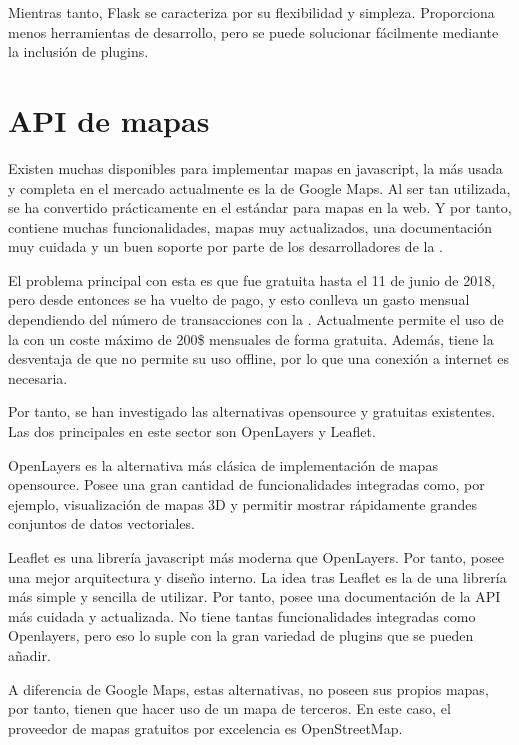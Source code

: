     Mientras tanto, Flask se caracteriza por su flexibilidad y simpleza. Proporciona menos herramientas de desarrollo, pero se puede solucionar fácilmente mediante la inclusión de plugins.
    
  
  \section{API de mapas}
  
    Existen muchas  disponibles para implementar mapas en javascript, la más usada y completa en el mercado actualmente es la de Google Maps\cite{gmaps}. Al ser tan utilizada, se ha convertido prácticamente en el estándar para mapas en la web. Y por tanto, contiene muchas funcionalidades, mapas muy actualizados, una documentación muy cuidada y un buen soporte por parte de los desarrolladores de la .
    
    El problema principal con esta  es que fue gratuita hasta el 11 de junio de 2018, pero desde entonces se ha vuelto de pago, y esto conlleva un gasto mensual dependiendo del número de transacciones con la . Actualmente permite el uso de la  con un coste máximo de 200\$ mensuales de forma gratuita. Además, tiene la desventaja de que no permite su uso offline, por lo que una conexión a internet es necesaria.

    
    Por tanto, se han investigado las alternativas opensource y gratuitas existentes. Las dos  principales en este sector son OpenLayers\cite{openlayers} y Leaflet\cite{leaflet}.
    
    OpenLayers es la alternativa más clásica de implementación de mapas opensource. Posee una gran cantidad de funcionalidades integradas como, por ejemplo, visualización de mapas 3D y permitir mostrar rápidamente grandes conjuntos de datos vectoriales.
    
    Leaflet es una librería javascript más moderna que OpenLayers. Por tanto, posee una mejor arquitectura y diseño interno. La idea tras Leaflet es la de una librería más simple y sencilla de utilizar. Por tanto, posee una documentación de la API más cuidada y actualizada. No tiene tantas funcionalidades integradas como Openlayers, pero eso lo suple con la gran variedad de plugins que se pueden añadir.
    
    A diferencia de Google Maps, estas alternativas, no poseen sus propios mapas, por tanto, tienen que hacer uso de un mapa de terceros. En este caso, el proveedor de mapas gratuitos por excelencia es OpenStreetMap\cite{osm}.
